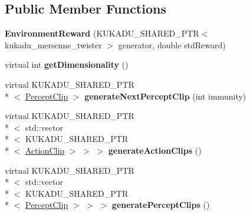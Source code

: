 \subsection*{Public Member Functions}
\begin{DoxyCompactItemize}
\item 
\hypertarget{classkukadu_1_1EnvironmentReward_a9b7aafdf7759916c3424c39e2e3fbded}{{\bfseries Environment\-Reward} (K\-U\-K\-A\-D\-U\-\_\-\-S\-H\-A\-R\-E\-D\-\_\-\-P\-T\-R$<$ kukadu\-\_\-mersenne\-\_\-twister $>$ generator, double std\-Reward)}\label{classkukadu_1_1EnvironmentReward_a9b7aafdf7759916c3424c39e2e3fbded}

\item 
\hypertarget{classkukadu_1_1EnvironmentReward_ab867e2a044297dca24d26ad931a025cc}{virtual int {\bfseries get\-Dimensionality} ()}\label{classkukadu_1_1EnvironmentReward_ab867e2a044297dca24d26ad931a025cc}

\item 
\hypertarget{classkukadu_1_1EnvironmentReward_a1f6effdfb0a9e305b18f021f65cfc61e}{virtual K\-U\-K\-A\-D\-U\-\_\-\-S\-H\-A\-R\-E\-D\-\_\-\-P\-T\-R\\*
$<$ \hyperlink{classkukadu_1_1PerceptClip}{Percept\-Clip} $>$ {\bfseries generate\-Next\-Percept\-Clip} (int immunity)}\label{classkukadu_1_1EnvironmentReward_a1f6effdfb0a9e305b18f021f65cfc61e}

\item 
\hypertarget{classkukadu_1_1EnvironmentReward_ae1d92344047594f9b216c8bf26949985}{virtual K\-U\-K\-A\-D\-U\-\_\-\-S\-H\-A\-R\-E\-D\-\_\-\-P\-T\-R\\*
$<$ std\-::vector\\*
$<$ K\-U\-K\-A\-D\-U\-\_\-\-S\-H\-A\-R\-E\-D\-\_\-\-P\-T\-R\\*
$<$ \hyperlink{classkukadu_1_1ActionClip}{Action\-Clip} $>$ $>$ $>$ {\bfseries generate\-Action\-Clips} ()}\label{classkukadu_1_1EnvironmentReward_ae1d92344047594f9b216c8bf26949985}

\item 
\hypertarget{classkukadu_1_1EnvironmentReward_a5818ba354251ea73759e7c4a89c0fe1a}{virtual K\-U\-K\-A\-D\-U\-\_\-\-S\-H\-A\-R\-E\-D\-\_\-\-P\-T\-R\\*
$<$ std\-::vector\\*
$<$ K\-U\-K\-A\-D\-U\-\_\-\-S\-H\-A\-R\-E\-D\-\_\-\-P\-T\-R\\*
$<$ \hyperlink{classkukadu_1_1PerceptClip}{Percept\-Clip} $>$ $>$ $>$ {\bfseries generate\-Percept\-Clips} ()}\label{classkukadu_1_1EnvironmentReward_a5818ba354251ea73759e7c4a89c0fe1a}

\end{DoxyCompactItemize}
